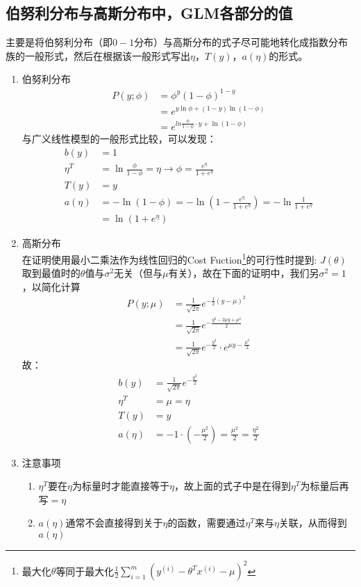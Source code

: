 \subsection{伯努利分布与高斯分布中，GLM各部分的值}
主要是将伯努利分布（即$0-1$分布）与高斯分布的式子尽可能地转化成指数分布族的一般形式，然后在根据该一般形式写出$\eta$，$T(y)$，$a(\eta)$的形式。\\
\begin{enumerate}
	\item 伯努利分布
	\begin{align}
		P(y;\phi) &= \phi^y(1-\phi)^{1-y} \\
		&= e^{y\ln \phi + (1-y)\ln(1-\phi)} \\
		&= e^{ln{\frac{\phi}{1-\phi}} \cdot y + \ln(1-\phi)}
	\end{align}
	与广义线性模型的一般形式比较，可以发现：
	\begin{align}
		b(y) &= 1 \\
		\eta^T &= \ln{\frac{\phi}{1-\phi}} = \eta \rightarrow \phi = \frac{e^{\eta}}{1+e^{\eta}} \\
		T(y) &= y \\
		a(\eta) &= -\ln(1-\phi) = -\ln{(1-\frac{e^{\eta}}{1+e^{\eta}})} = -\ln{\frac{1}{1+e^\eta}} \\
		&= \ln(1+e^\eta)
	\end{align}

	\item 高斯分布 \\
	在证明使用最小二乘法作为线性回归的Cost Fuction\footnote{最大化$\theta$等同于最大化$\frac{1}{2} \sum_{i=1}^{m}\left(y^{(i)}-\theta^Tx^{(i)}-\mu\right)^2$}的可行性时提到: $J(\theta)$取到最值时的$\theta$值与$\sigma^2$无关（但与$\mu$有关），故在下面的证明中，我们另$\sigma^2=1$，以简化计算
	\begin{align}
		P(y;\mu) &= \frac{1}{\sqrt{2\pi}}e^{-\frac{1}{2}\left(y-\mu\right)^2} \\
		&= \frac{1}{\sqrt{2\pi}} e^{-\frac{y^2-2\mu y +\mu^2}{2}} \\
		&= \frac{1}{\sqrt{2\pi}}e^{-\frac{y^2}{2}} \cdot e^{\mu y-\frac{\mu^2}{2}}
	\end{align}
	故：
	\begin{align}
		b(y) &= \frac{1}{\sqrt{2\pi}}e^{-\frac{y^2}{2}} \\
		\eta^T &= \mu = \eta \\
		T(y) &= y \\
		a(\eta) &= -1\cdot (-\frac{\mu^2}{2}) = \frac{\mu^2}{2} = \frac{\eta^2}{2}
	\end{align}

	\item 注意事项
	\begin{enumerate}
		\item $\eta^T$要在$\eta$为标量时才能直接等于$\eta$，故上面的式子中是在得到$\eta^T$为标量后再写$=\eta$
		\item $a(\eta)$通常不会直接得到关于$\eta$的函数，需要通过$\eta^T$来与$\eta$关联，从而得到$a(\eta)$
	\end{enumerate}
\end{enumerate}

